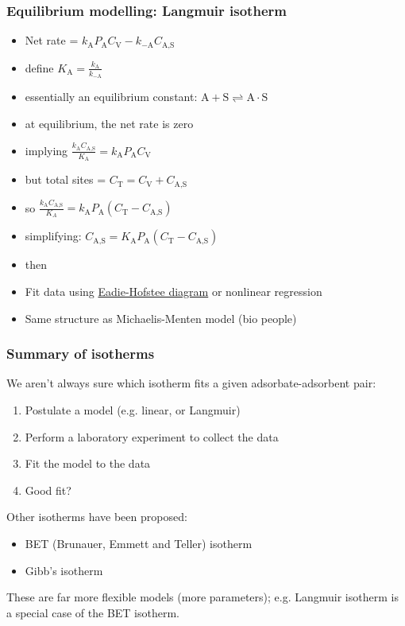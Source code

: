 \begin{frame}\frametitle{Equilibrium modelling: Langmuir isotherm}
	\begin{itemize}
		\item	Net rate = $k_\text{A} P_\text{A} C_\text{V} - k_{-\text{A}} C_\text{A,S}$  
		\item	define $K_\text{A} = \displaystyle\frac{k_\text{A}}{k_{-\text{A}}}$
		\item	essentially an equilibrium constant: $\text{A} + \text{S} \rightleftharpoons \text{A}\cdot \text{S}$		
		\item	at equilibrium, the net rate is zero 
		\pause
		\item	implying $\displaystyle\frac{k_\text{A}C_\text{A,S}}{K_\text{A}} = k_\text{A} P_\text{A} C_\text{V}$  
		\item	but total sites = $C_\text{T} = C_\text{V} + C_\text{A,S}$
		\item	so $\displaystyle\frac{k_\text{A}C_\text{A,S}}{K_A} = k_\text{A} P_\text{A} \left(C_\text{T} -  C_\text{A,S}\right)$  
		\item	simplifying: $C_\text{A,S} = K_\text{A} P_\text{A} \left(C_\text{T} -  C_\text{A,S}\right)$  
		\item	then 
		\item	Fit data using \href{http://en.wikipedia.org/wiki/Eadie\%E2\%80\%93Hofstee\_plot}{Eadie-Hofstee diagram} or nonlinear regression
		\item	Same structure as Michaelis-Menten model (bio people)
	\end{itemize}
\end{frame}

\begin{frame}\frametitle{Summary of isotherms}
	We aren't always sure which isotherm fits a given adsorbate-adsorbent pair:
	\begin{enumerate}
		\item	Postulate a model (e.g. linear, or Langmuir)
		\item	Perform a laboratory experiment to collect the data
		\item	Fit the model to the data
		\item	Good fit? 
	\end{enumerate}
	
	\vspace{24pt}
	Other isotherms have been proposed:
	\begin{itemize}
		\item	BET (Brunauer, Emmett and Teller) isotherm
		\item	Gibb's isotherm
	\end{itemize}
	
	These are far more flexible models (more parameters); e.g. Langmuir isotherm is a special case of the BET isotherm.
\end{frame}

